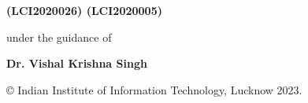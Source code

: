 \begin{center}
    \vspace{0.1cm}
    
    {\bf {(LCI2020026)} \hspace{0.5cm} \bf {(LCI2020005)}}
    
    \vspace{1.8cm}
    
    {under the guidance of}
    
    \vspace{0.1cm}

        {\bf{Dr. Vishal Krishna Singh}}

\end{center}

\medskip

\centerline{ \copyright{} Indian Institute of Information Technology, Lucknow 2023.}

\cleardoublepage






